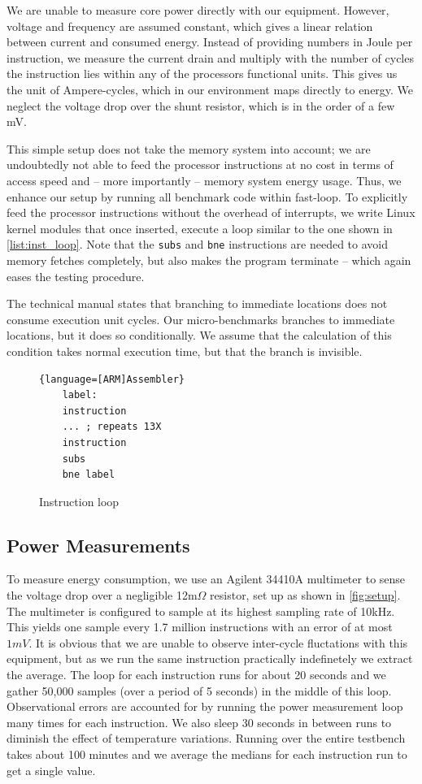 We are unable to measure core power directly with our equipment. However,
voltage and frequency are assumed constant, which gives a linear relation
between current and consumed energy. Instead of providing numbers in Joule per
instruction, we measure the current drain and multiply with the number of cycles
the instruction lies within any of the processors functional units. This gives
us the unit of Ampere-cycles, which in our environment maps directly to energy.
We neglect the voltage drop over the shunt resistor, which is in the order of a
few mV.

This simple setup does not take the memory system into account; we are
undoubtedly not able to feed the processor instructions at no cost in terms of
access speed and -- more importantly -- memory system energy usage. Thus, we
enhance our setup by running all benchmark code within fast-loop. To explicitly
feed the processor instructions without the overhead of interrupts, we write
Linux kernel modules that once inserted, execute a loop similar to the one shown
in \autoref{list:inst_loop}. Note that the \texttt{subs} and \texttt{bne}
instructions are needed to avoid memory fetches completely, but also makes the
program terminate -- which again eases the testing procedure.

The technical manual states that branching to immediate locations
does not consume execution unit cycles. Our micro-benchmarks branches to
immediate locations, but it does so conditionally. We assume that the
calculation of this condition takes normal execution time, but that the branch
is invisible.

\begin{figure}
    \begin{lstlisting}{language=[ARM]Assembler}
    label:
    instruction
    ... ; repeats 13X
    instruction
    subs
    bne label
    \end{lstlisting}
    \caption{Instruction loop}
    \label{list:inst_loop}
\end{figure}

\subsection{Power Measurements}
To measure energy consumption, we use an Agilent 34410A
multimeter\cite{agilent34410a} to sense the voltage drop over a negligible
12m$\Omega$ resistor, set up as shown in \autoref{fig:setup}. The multimeter is
configured to sample at its highest sampling rate of 10kHz. This yields one
sample every 1.7 million instructions with an error of at most $1 mV$. It is
obvious that we are unable to observe inter-cycle fluctations with this
equipment, but as we run the same instruction practically indefinetely we
extract the average. The loop for each instruction runs for about 20 seconds and
we gather 50,000 samples (over a period of 5 seconds) in the middle of this loop.
Observational errors are accounted for by running the power measurement loop
many times for each instruction. We also sleep 30 seconds in between runs to
diminish the effect of temperature variations. Running over the entire testbench
takes about 100 minutes and we average the medians for each instruction run to
get a single value.

